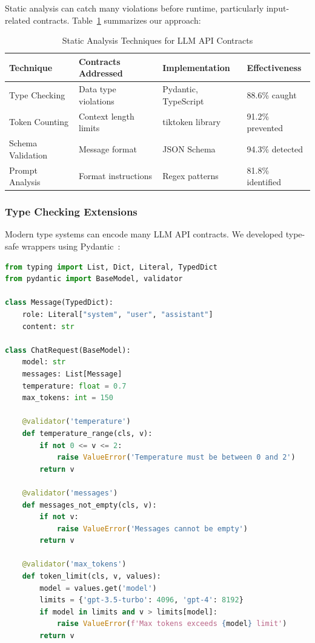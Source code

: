 \documentclass[11pt]{article}
\begin{document}
Static analysis can catch many violations before runtime, particularly input-related contracts. Table~\ref{tab:static_analysis} summarizes our approach:

\begin{table}[h]
\centering
\caption{Static Analysis Techniques for LLM API Contracts}
\label{tab:static_analysis}
\begin{tabular}{p{3cm}p{4cm}p{3cm}p{3cm}}
\toprule
\textbf{Technique} & \textbf{Contracts Addressed} & \textbf{Implementation} & \textbf{Effectiveness} \\
\midrule
Type Checking & Data type violations & Pydantic, TypeScript & 88.6\% caught \\
Token Counting & Context length limits & tiktoken library & 91.2\% prevented \\
Schema Validation & Message format & JSON Schema & 94.3\% detected \\
Prompt Analysis & Format instructions & Regex patterns & 81.8\% identified \\
\bottomrule
\end{tabular}
\end{table}

\subsubsection{Type Checking Extensions}

Modern type systems can encode many LLM API contracts. We developed type-safe wrappers using Pydantic~\cite{pydantic2023}:

\begin{lstlisting}[language=Python, caption={Type-safe LLM API wrapper}]
from typing import List, Dict, Literal, TypedDict
from pydantic import BaseModel, validator

class Message(TypedDict):
    role: Literal["system", "user", "assistant"]
    content: str

class ChatRequest(BaseModel):
    model: str
    messages: List[Message]
    temperature: float = 0.7
    max_tokens: int = 150
    
    @validator('temperature')
    def temperature_range(cls, v):
        if not 0 <= v <= 2:
            raise ValueError('Temperature must be between 0 and 2')
        return v
    
    @validator('messages')
    def messages_not_empty(cls, v):
        if not v:
            raise ValueError('Messages cannot be empty')
        return v
        
    @validator('max_tokens')
    def token_limit(cls, v, values):
        model = values.get('model')
        limits = {'gpt-3.5-turbo': 4096, 'gpt-4': 8192}
        if model in limits and v > limits[model]:
            raise ValueError(f'Max tokens exceeds {model} limit')
        return v
\end{lstlisting}
\end{document}

